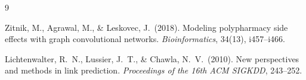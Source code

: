 \documentclass[12pt, a4paper]{article}
\begin{document}
\begin{thebibliography}{9}

Zitnik, M., Agrawal, M., \& Leskovec, J.\ (2018).
Modeling polypharmacy side effects with graph convolutional networks.
\textit{Bioinformatics}, 34(13), i457--i466.

Lichtenwalter, R.\ N., Lussier, J.\ T., \& Chawla, N.\ V.\ (2010).
New perspectives and methods in link prediction.
\textit{Proceedings of the 16th ACM SIGKDD}, 243--252.

\end{thebibliography}
\end{document}
